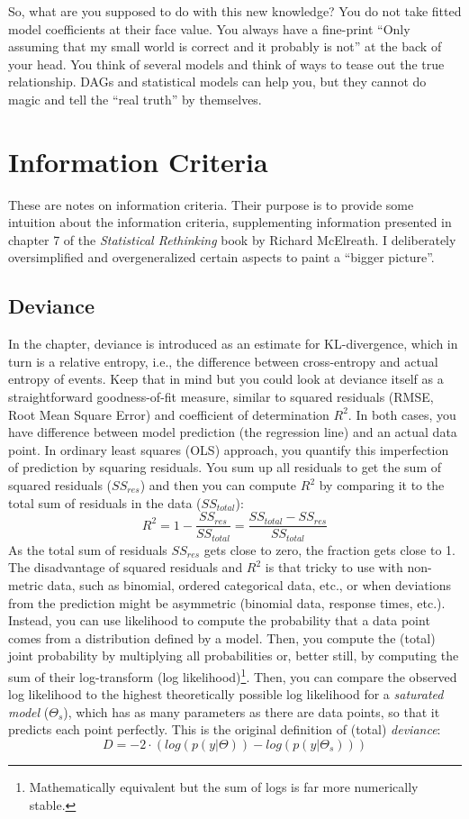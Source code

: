 \documentclass[
]{book}
\begin{document}
So, what are you supposed to do with this new knowledge? You do not take fitted model coefficients at their face value. You always have a fine-print ``Only assuming that my small world is correct and it probably is not'' at the back of your head. You think of several models and think of ways to tease out the true relationship. DAGs and statistical models can help you, but they cannot do magic and tell the ``real truth'' by themselves.

\hypertarget{information-criteria}{%
\chapter{Information Criteria}\label{information-criteria}}

These are notes on information criteria. Their purpose is to provide some intuition about the information criteria, supplementing information presented in chapter 7 of the \emph{Statistical Rethinking} book by Richard McElreath. I deliberately oversimplified and overgeneralized certain aspects to paint a ``bigger picture''.

\hypertarget{deviance}{%
\section{Deviance}\label{deviance}}

In the chapter, deviance is introduced as an estimate for KL-divergence, which in turn is a relative entropy, i.e., the difference between cross-entropy and actual entropy of events. Keep that in mind but you could look at deviance itself as a straightforward goodness-of-fit measure, similar to squared residuals (RMSE, Root Mean Square Error) and coefficient of determination \(R^2\). In both cases, you have difference between model prediction (the regression line) and an actual data point. In ordinary least squares (OLS) approach, you quantify this imperfection of prediction by squaring residuals. You sum up all residuals to get the sum of squared residuals (\(SS_{res}\)) and then you can compute \(R^2\) by comparing it to the total sum of residuals in the data (\(SS_{total}\)):
\[R^2 = 1 - \frac{SS_{res}}{SS_{total}} = \frac{SS_{total} - SS_{res}}{SS_{total}}\]
As the total sum of residuals \(SS_{res}\) gets close to zero, the fraction gets close to 1. The disadvantage of squared residuals and \(R^2\) is that tricky to use with non-metric data, such as binomial, ordered categorical data, etc., or when deviations from the prediction might be asymmetric (binomial data, response times, etc.). Instead, you can use likelihood to compute the probability that a data point comes from a distribution defined by a model. Then, you compute the (total) joint probability by multiplying all probabilities or, better still, by computing the sum of their log-transform (log likelihood)\footnote{Mathematically equivalent but the sum of logs is far more numerically stable.}. Then, you can compare the observed log likelihood to the highest theoretically possible log likelihood for a \emph{saturated model} (\(\Theta_s\)), which has as many parameters as there are data points, so that it predicts each point perfectly. This is the original definition of (total) \emph{deviance}:
\[D = -2 \cdot (log(p(y|\Theta)) - log(p(y|\Theta_s)))\]
\end{document}
